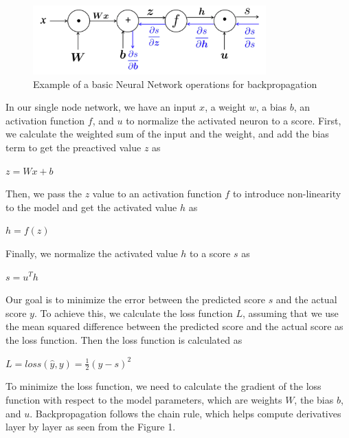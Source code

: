 \documentclass[12pt]{article}
\newcommand*\setcaptioncitation[1]{\def\captioncitation{\textit{Source:}~#1}}
\let\captioncitation\relax
\begin{document}
\begin{description}
  \begin{figure}[h]
    \centering
    \includegraphics[width=0.8\textwidth]{Picture1.png}
    \setcaptioncitation{Source: Mohaisen, D. (2025). Lecture 6: Pitfalls in Word Vectors and Backpropagation
    [PowerPoint slides]. University of Central Florida Computer Understanding of Natural Language: http://www.cs.ucf.edu/}
    \caption{Example of a basic Neural Network operations for backpropagation}
  \end{figure}

  In our single node network, we have an input $x$, a weight $w$, a bias $b$, an activation function $f$, and $u$ to normalize the activated neuron to a score. First, we calculate the
  weighted sum of the input and the weight, and add the bias term to get the preactived value $z$ as 

  \begin{center}
    $z = Wx + b$
  \end{center}

  Then, we pass the $z$ value to an activation function $f$ to introduce non-linearity to the model and get the activated value $h$ as

  \begin{center}
    $h = f(z)$
  \end{center}

  Finally, we normalize the activated value $h$ to a score $s$ as

  \begin{center}
    $s = u^Th$
  \end{center}

  Our goal is to minimize the error between the predicted score $s$ and the actual score $y$. To achieve this, we calculate the loss function $L$, assuming that we use the mean squared difference between
  the predicted score and the actual score as the loss function. Then the loss function is calculated as

  \begin{center}
    $\displaystyle{L = loss(\hat{y}, y) = \frac{1}{2}(y - s)^2}$
  \end{center}

  To minimize the loss function, we need to calculate the gradient of the loss function with respect to the model parameters, which are weights $W$, the bias $b$, and $u$.
  Backpropagation follows the chain rule, which helps compute derivatives layer by layer as seen from the Figure 1.


\end{description}
\end{document}
